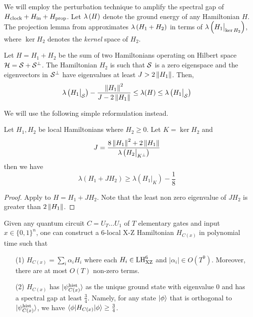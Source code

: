 We will employ the perturbation technique to amplify the spectral gap of $H_{\mathrm{clock}} + H_{\mathrm{in}} + H_{\mathrm{prop}}$.
Let ${\lambda \left (H \right)}$ denote the ground energy of any Hamiltonian $H$.
The projection lemma from \cite{kempe_kitaev_regev_2006} approximates ${\lambda \left (H_1 + H_2 \right)}$ in terms of ${\lambda \left (H_1\big|_{\ker H_2} \right)}$, where $\ker H_2$ denotes the \emph{kernel} space of $H_2$.

\begin{lem}
    \label{thm:proj1}
    Let $H=H_1+H_2$ be the sum of two Hamiltonians operating on Hilbert space $\mathcal{H}=\mathcal{S}+\mathcal{S}^\bot$.
    The Hamiltonian $H_2$ is such that $\mathcal{S}$ is a zero eigenspace and the eigenvectors in $\mathcal{S}^\bot$ have eigenvalues at least $J>2\left\lVert H_1\right\rVert$. Then,
    $$\lambda\left(H_1\big|_{\mathcal{S}}\right)-\frac{\left\lVert H_1\right\rVert^2}{J-2\left\lVert H_1\right\rVert}\leq\lambda(H)\leq\lambda\left(H_1\big|_{\mathcal{S}}\right)$$
\end{lem}

We will use the following simple reformulation instead.

\begin{lem}
    \label{lem:projection}
    Let $H_1, H_2$ be local Hamiltonians where $H_2\geq0$. Let $K=\ker H_2$ and
    $$J=\frac{8\left\lVert H_1\right\rVert^2+ 2\left\lVert H_1\right\rVert}{\lambda\left(H_2\big|_{K^\bot}\right)}$$
    then we have
    $$\lambda(H_1+JH_2)\geq\lambda\left(H_1\big|_K\right)-\frac{1}{8}$$
\end{lem}
\begin{proof}
    Apply  to $H=H_1+JH_2$. Note that the least non zero eigenvalue of $JH_2$ is greater than $2\left\lVert H_1\right\rVert$.
\end{proof}

\begin{thm}
    \label{thm:LHReduction}
    Given any quantum circuit $C = U_T \ldots U_1$ of  $T$ elementary gates and input $x \in \{0,1\}^n$, one can construct a 6-local X-Z Hamiltonian $H_{C(x)}$ in polynomial time such that
    \begin{enumerate}
        \item[(1)] $H_{C(x)} = \sum_i \alpha_i H_i$ where
        each $H_i \in \mathrm{LH}_{\mathrm{XZ}}^{6}$ and $|\alpha_i| \in O(T^9)$. Moreover, there are at most $O(T)$ non-zero terms.
        \item[(2)] $H_{C(x)}$ has $\ket{\psi_{C(x)}^{\mathrm{hist}}}$ as the unique ground state with eigenvalue $0$ and has a spectral gap at least $\frac{3}{4}$. Namely,  for any state $\ket\phi$ that is orthogonal to $\ket{\psi_{C(x)}^{\mathrm{hist}}}$, we have $\braket{\phi|H_{C(x)}|\phi}\geq \frac{3}{4}$.
    \end{enumerate}
\end{thm}

